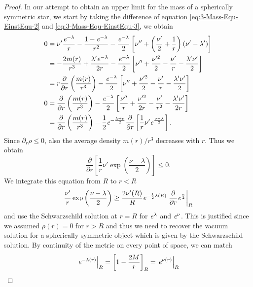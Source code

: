 \begin{proof}
	In our attempt to obtain an upper limit for the mass of a spherically symmetric star, we start by taking the difference of equation \eqref{eq:3-Mass-Equ-EinstEqu-2} and \eqref{eq:3-Mass-Equ-EinstEqu-3}, we obtain
	\begin{align}
		0 &= \nu'\frac{\mathit{e}^{-\lambda}}{r} - \frac{1-\mathit{e}^{-\lambda}}{r^2} - \frac{\mathit{e}^{-\lambda}}{2}\left[\nu''+\left(\frac{\nu'}{2} + \frac{1}{r}\right)\left(\nu'-\lambda'\right) \right]\\
		&= - \frac{2m(r)}{r^3} + \frac{\lambda'\mathit{e}^{-\lambda}}{2r} -  \frac{\mathit{e}^{-\lambda}}{2}\left[\nu''+ \frac{\nu'^2}{2} - \frac{\nu'}{r} -\frac{\lambda'\nu'}{2}\right]\\
		&= r\frac{\partial}{\partial r}\left(\frac{m(r)}{r^3}\right) - \frac{\mathit{e}^{-\lambda}}{2}\left[\nu''+ \frac{\nu'^2}{2} - \frac{\nu'}{r} -\frac{\lambda'\nu'}{2}\right]\\
		0 &= \frac{\partial}{\partial r}\left(\frac{m(r)}{r^3}\right) - \frac{\mathit{e}^{-\lambda}}{2}\left[\frac{\nu''}{r}+ \frac{\nu'^2}{2r} - \frac{\nu'}{r^2} -\frac{\lambda'\nu'}{2r}\right]\\
		&= \frac{\partial}{\partial r}\left(\frac{m(r)}{r^3}\right) - \frac{1}{2}\mathit{e}^{-\frac{\lambda+\nu}{2}}\frac{\partial}{\partial r}\left[\frac{1}{r}\nu'\mathit{e}^{\frac{\nu-\lambda}{2}}\right].
	\end{align}
	Since $\partial_r\rho\leq0$, also the average density $m(r)/r^3$ decreases with $r$.
	Thus we obtain
	\begin{equation}
		\frac{\partial}{\partial r}\left[\frac{1}{r}\nu'\exp\left(\frac{\nu-\lambda}{2}\right) \right] \leq 0.
	\end{equation}
	We integrate this equation from $R$ to $r<R$
	\begin{equation}
		\frac{\nu'}{r}\exp\left(\frac{\nu-\lambda}{2}\right)\geq\frac{2\nu'(R)}{R}\mathit{e}^{-\frac{1}{2}\lambda(R)}\left.\frac{\partial}{\partial r}\mathit{e}^{\frac{\nu}{2}}\right|_R
	\end{equation}
	and use the Schwarzschild solution at $r=R$ for $\mathit{e}^\lambda$ and $\mathit{e}^\nu$. 
	This is justified since we assumed $\rho(r)=0$ for $r>R$ and thus we need to recover the vacuum solution for a spherically symmetric object which is given by the Schwarzschild solution. 
	By continuity of the metric on every point of space, we can match 
	\begin{equation}
		\left.\mathit{e}^{-\lambda(r)}\right|_R=\left[1-\frac{2M}{r}\right]_R=\left.\mathit{e}^{\nu(r)}\right|_R
		\label{eq:3-Mass-Equ-MassLimitApprox1}
	\end{equation}

\end{proof}
